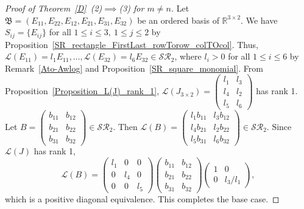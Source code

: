 \documentclass[11pt,reqno]{amsart}
\theoremstyle{plain}
\theoremstyle{definition}
\numberwithin{equation}{section}
\begin{document}
\begin{proof}[Proof of Theorem~\ref{D}~(2)$\implies$(3) for $m\neq n$]
	Let $\mathfrak{B}=(E_{11}, E_{22}, E_{12}, E_{21}, E_{31}, E_{32})$ be an ordered basis of $\mathbb{R}^{3\times 2}$. We have $S_{ij}=\{E_{ij}\}$ for all $1\leq i\leq 3, ~ 1\leq j\leq 2$ by Proposition~\ref{SR_rectangle_FirstLast_rowTorow_colTOcol}. Thus, $\mathcal{L}(E_{11})= l_{1}E_{11},\ldots,\mathcal{L}(E_{32})= l_{6}E_{32}\in \mathcal{SR}_2$, where $l_{i}>0$ for all $1\leq i\leq 6$ by Remark~\ref{Ato-Awlog} and Proposition~\ref{SR_square_monomial}. 
	From Proposition~\ref{Proposition_L(J)_rank_1},
	$\mathcal{L}(J_{3\times2})=\begin{pmatrix}
		l_{1} & l_{3}  \\
		l_{4} & l_{2} \\
		l_{5} & l_{6}  
	\end{pmatrix}$ has rank 1. Let $B=\begin{pmatrix}
		b_{11} & b_{12} \\
		b_{21} & b_{22} \\
		b_{31} & b_{32}
	\end{pmatrix}\in \mathcal{SR}_2.$ Then $\mathcal{L}(B)=\begin{pmatrix}
		l_{1}b_{11} & l_{3}b_{12} \\
		l_{4}b_{21} & l_{2}b_{22} \\
		l_{5}b_{31} & l_{6}b_{32}
	\end{pmatrix}\in \mathcal{SR}_2.$ Since $\mathcal{L}(J)$ has rank 1,
	\[\mathcal{L}(B)=\begin{pmatrix}
		l_{1} & 0 & 0 \\
		0 & l_{4} & 0 \\
		0 & 0 & l_{5}
	\end{pmatrix}\begin{pmatrix}
		b_{11} & b_{12} \\
		b_{21} & b_{22} \\
		b_{31} & b_{32}
	\end{pmatrix}\begin{pmatrix}
		1 & 0 \\
		0 & l_{3}/l_{1}
	\end{pmatrix},\] 
	which is a positive diagonal equivalence. This completes the base case. \smallskip
	

\end{proof}
\end{document}
